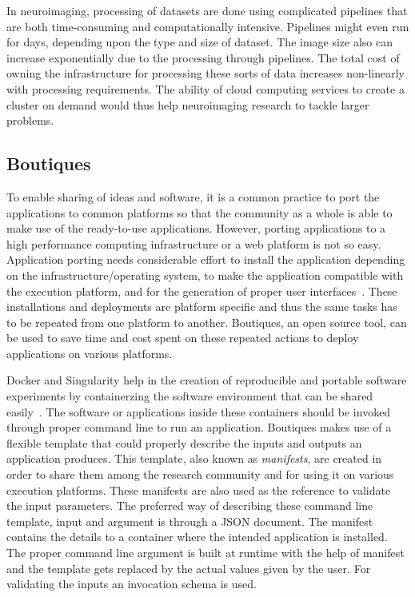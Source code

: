 In neuroimaging, processing of datasets are done using complicated pipelines that are both time-consuming and computationally intensive. Pipelines might even run for days, depending upon the type and size of dataset. The image size also can increase exponentially due to the processing through pipelines. The total cost of owning the infrastructure for processing these sorts of data increases non-linearly with processing requirements. The ability of cloud computing services to create a cluster on demand would thus help neuroimaging research to tackle larger problems.

\subsection{Boutiques}
To enable sharing of ideas and software, it is a common practice to port the applications to common platforms so that the community as a whole is able to make use of the ready-to-use applications. However, porting applications to a high performance computing infrastructure or a web platform is not so easy. Application porting needs considerable effort to install the application depending on the infrastructure/operating system, to make the application compatible with the execution platform, and for the generation of proper user interfaces~\cite{boutiques}. These installations and deployments are platform specific and thus the same tasks has to be repeated from one platform to another. Boutiques, an open source tool, can be used to save time and cost spent on these repeated actions to deploy applications on various platforms.

Docker and Singularity help in the creation of reproducible and portable software experiments by containerzing the software environment that can be shared easily~\cite{boutiques}. The software or applications inside these containers should be invoked through proper command line to run an application. Boutiques makes use of a flexible template that could properly describe the inputs and outputs an application produces. This template, also known as \textit{manifests}, are created in order to share them among the research community and for using it on various execution platforms. These manifests are also used as the reference to validate the input parameters. The preferred way of describing these command line template, input and argument is through a JSON document. The manifest contains the details to a container where the intended application is installed. The proper command line argument is built at runtime with the help of manifest and the template gets replaced by the actual values given by the user. For validating the inputs an invocation schema is used.

